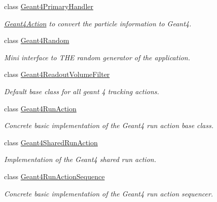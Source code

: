 \begin{DoxyCompactItemize}
class \hyperlink{class_d_d4hep_1_1_simulation_1_1_geant4_primary_handler}{Geant4PrimaryHandler}
\begin{DoxyCompactList}\small\item\em \hyperlink{class_d_d4hep_1_1_simulation_1_1_geant4_action}{Geant4Action} to convert the particle information to Geant4. \item\end{DoxyCompactList}\item 
class \hyperlink{class_d_d4hep_1_1_simulation_1_1_geant4_random}{Geant4Random}
\begin{DoxyCompactList}\small\item\em Mini interface to THE random generator of the application. \item\end{DoxyCompactList}\item 
class \hyperlink{class_d_d4hep_1_1_simulation_1_1_geant4_readout_volume_filter}{Geant4ReadoutVolumeFilter}
\begin{DoxyCompactList}\small\item\em Default base class for all geant 4 tracking actions. \item\end{DoxyCompactList}\item 
class \hyperlink{class_d_d4hep_1_1_simulation_1_1_geant4_run_action}{Geant4RunAction}
\begin{DoxyCompactList}\small\item\em Concrete basic implementation of the Geant4 run action base class. \item\end{DoxyCompactList}\item 
class \hyperlink{class_d_d4hep_1_1_simulation_1_1_geant4_shared_run_action}{Geant4SharedRunAction}
\begin{DoxyCompactList}\small\item\em Implementation of the Geant4 shared run action. \item\end{DoxyCompactList}\item 
class \hyperlink{class_d_d4hep_1_1_simulation_1_1_geant4_run_action_sequence}{Geant4RunActionSequence}
\begin{DoxyCompactList}\small\item\em Concrete basic implementation of the Geant4 run action sequencer. \item\end{DoxyCompactList}\item 

\end{DoxyCompactItemize}
